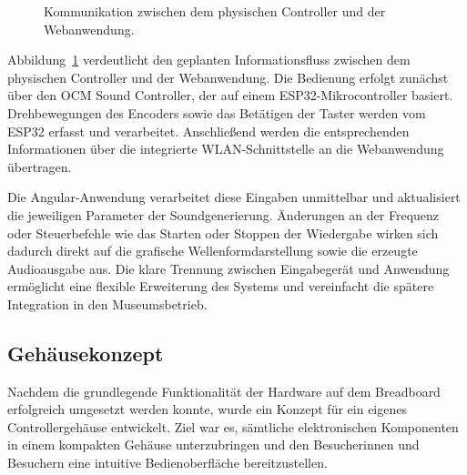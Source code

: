 \begin{figure}[H]
    \centering
    \caption{Kommunikation zwischen dem physischen Controller und der Webanwendung.}
    \label{fig:kommunikation}
    \end{figure}

    Abbildung~\ref{fig:kommunikation} verdeutlicht den geplanten Informationsfluss
zwischen dem physischen Controller und der Webanwendung. Die Bedienung erfolgt
zunächst über den OCM Sound Controller, der auf einem ESP32-Mikrocontroller basiert.
Drehbewegungen des Encoders sowie das Betätigen der Taster werden vom ESP32
erfasst und verarbeitet. Anschließend werden die entsprechenden Informationen über
die integrierte WLAN-Schnittstelle an die Webanwendung übertragen.

Die Angular-Anwendung verarbeitet diese Eingaben unmittelbar und aktualisiert die
jeweiligen Parameter der Soundgenerierung. Änderungen an der Frequenz oder
Steuerbefehle wie das Starten oder Stoppen der Wiedergabe wirken sich dadurch
direkt auf die grafische Wellenformdarstellung sowie die erzeugte Audioausgabe aus.
Die klare Trennung zwischen Eingabegerät und Anwendung ermöglicht eine flexible
Erweiterung des Systems und vereinfacht die spätere Integration in den Museumsbetrieb.

\subsection{Gehäusekonzept}

Nachdem die grundlegende Funktionalität der Hardware auf dem Breadboard erfolgreich
umgesetzt werden konnte, wurde ein Konzept für ein eigenes Controllergehäuse
entwickelt. Ziel war es, sämtliche elektronischen Komponenten in einem kompakten
Gehäuse unterzubringen und den Besucherinnen und Besuchern eine intuitive
Bedienoberfläche bereitzustellen.

